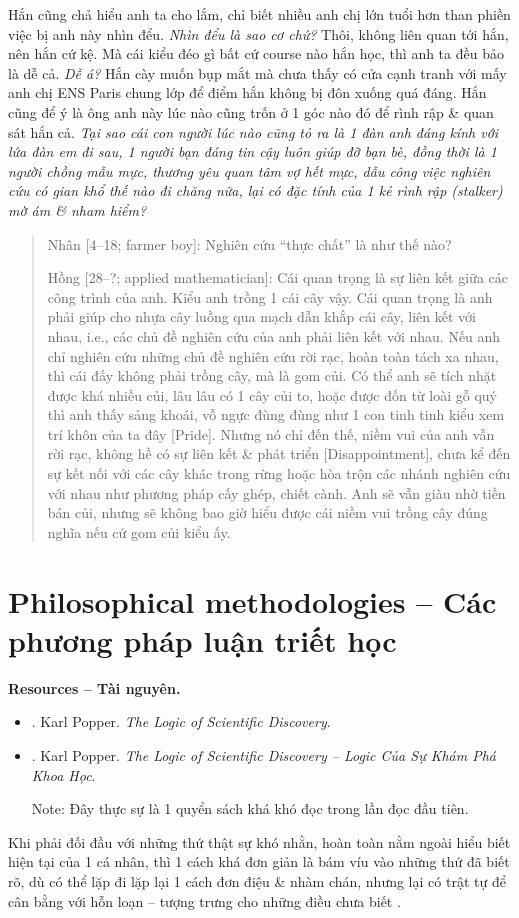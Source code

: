 \documentclass[12pt,twoside]{book}
\begin{document}
Hắn cũng chả hiểu anh ta cho lắm, chỉ biết nhiều anh chị lớn tuổi hơn than phiền việc bị anh này nhìn đểu. {\it Nhìn đểu là sao cơ chứ?} Thôi, không liên quan tới hắn, nên hắn cứ kệ. Mà cái kiểu đéo gì bất cứ course nào hắn học, thì anh ta đều bảo là dễ cả. {\it Dễ á?} Hắn cày muốn bụp mắt mà chưa thấy có cửa cạnh tranh với mấy anh chị ENS Paris chung lớp để điểm hắn không bị đôn xuống quá đáng. Hắn cũng để ý là ông anh này lúc nào cũng trốn ở 1 góc nào đó để rình rập \& quan sát hắn cả. {\it Tại sao cái con người lúc nào cũng tỏ ra là 1 đàn anh đáng kính với lứa đàn em đi sau, 1 người bạn đáng tin cậy luôn giúp đỡ bạn bè, đồng thời là 1 người chồng mẫu mực, thương yêu quan tâm vợ hết mực, dẫu công việc nghiên cứu có gian khổ thế nào đi chăng nữa, lại có đặc tính của 1 kẻ rình rập (stalker) mờ ám \& nham hiểm?}

\begin{quote}
	{\sf Nhân [4--18; farmer boy]}: Nghiên cứu ``thực chất'' là như thế nào?
	
	{\sf Hồng [28--?; applied mathematician]}: Cái quan trọng là sự liên kết giữa các công trình của anh. Kiểu anh trồng 1 cái cây vậy. Cái quan trọng là anh phải giúp cho nhựa cây luồng qua mạch dẫn khắp cái cây, liên kết với nhau, i.e., các chủ đề nghiên cứu của anh phải liên kết với nhau. Nếu anh chỉ nghiên cứu những chủ đề nghiên cứu rời rạc, hoàn toàn tách xa nhau, thì cái đấy không phải trồng cây, mà là gom củi. Có thể anh sẽ tích nhặt được khá nhiều củi, lâu lâu có 1 cây củi to, hoặc được đốn từ loài gỗ quý thì anh thấy sảng khoái, vỗ ngực đùng đùng như 1 con tinh tinh kiểu xem trí khôn của ta đây [{\sc Pride}]. Nhưng nó chỉ đến thế, niềm vui của anh vẫn rời rạc, không hề có sự liên kết \& phát triển [{\sc Disappointment}], chưa kể đến sự kết nối với các cây khác trong rừng hoặc hòa trộn các nhánh nghiên cứu với nhau như phương pháp cấy ghép, chiết cành. Anh sẽ vẫn giàu nhờ tiền bán củi, nhưng sẽ không bao giờ hiểu được cái niềm vui trồng cây đúng nghĩa nếu cứ gom củi kiểu ấy.
\end{quote}

\section{Philosophical methodologies -- Các phương pháp luận triết học}
{\bf \textsf{Resources -- Tài nguyên.}}
\begin{itemize}
	\item \cite{Popper_logic_science}. {\sc Karl Popper}. {\it The Logic of Scientific Discovery}.
	\item \cite{Popper_logic_khoa_hoc}. {\sc Karl Popper}. {\it The Logic of Scientific Discovery -- Logic Của Sự Khám Phá Khoa Học}.
	
	{\sf Note}: Đây thực sự là 1 quyển sách khá khó đọc trong lần đọc đầu tiên.
\end{itemize}
Khi phải đối đầu với những thứ thật sự khó nhằn, hoàn toàn nằm ngoài hiểu biết hiện tại của 1 cá nhân, thì 1 cách khá đơn giản là bám víu vào những thứ đã biết rõ, dù có thể lặp đi lặp lại 1 cách đơn điệu \& nhàm chán, nhưng lại có trật tự để cân bằng với hỗn loạn -- tượng trưng cho những điều chưa biết \cite{Peterson_rule,Peterson_rule_VN,Peterson_beyond_order,Peterson_beyond_order_VN}.
\end{document}
